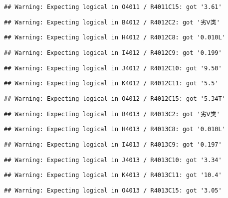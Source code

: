 \documentclass[
]{article}
\begin{document}
\begin{verbatim}
## Warning: Expecting logical in O4011 / R4011C15: got '3.61'
\end{verbatim}

\begin{verbatim}
## Warning: Expecting logical in B4012 / R4012C2: got '劣Ⅴ类'
\end{verbatim}

\begin{verbatim}
## Warning: Expecting logical in H4012 / R4012C8: got '0.010L'
\end{verbatim}

\begin{verbatim}
## Warning: Expecting logical in I4012 / R4012C9: got '0.199'
\end{verbatim}

\begin{verbatim}
## Warning: Expecting logical in J4012 / R4012C10: got '9.50'
\end{verbatim}

\begin{verbatim}
## Warning: Expecting logical in K4012 / R4012C11: got '5.5'
\end{verbatim}

\begin{verbatim}
## Warning: Expecting logical in O4012 / R4012C15: got '5.34T'
\end{verbatim}

\begin{verbatim}
## Warning: Expecting logical in B4013 / R4013C2: got '劣Ⅴ类'
\end{verbatim}

\begin{verbatim}
## Warning: Expecting logical in H4013 / R4013C8: got '0.010L'
\end{verbatim}

\begin{verbatim}
## Warning: Expecting logical in I4013 / R4013C9: got '0.197'
\end{verbatim}

\begin{verbatim}
## Warning: Expecting logical in J4013 / R4013C10: got '3.34'
\end{verbatim}

\begin{verbatim}
## Warning: Expecting logical in K4013 / R4013C11: got '10.4'
\end{verbatim}

\begin{verbatim}
## Warning: Expecting logical in O4013 / R4013C15: got '3.05'
\end{verbatim}
\end{document}
